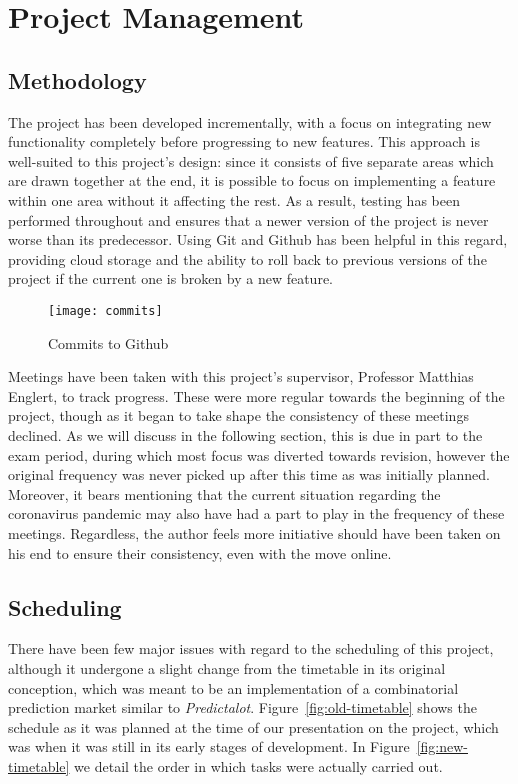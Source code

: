 \section{Project Management}

\label{sec:projectManagement}

\subsection{Methodology}

The project has been developed incrementally, with a focus on integrating new
functionality completely before progressing to new features. This approach is
well-suited to this project's design: since it consists of five separate areas
which are drawn together at the end, it is possible to focus on implementing a
feature within one area without it affecting the rest. As a result, testing has
been performed throughout and ensures that a newer version of the project is
never worse than its predecessor. Using Git and Github has been helpful in this
regard, providing cloud storage and the ability to roll back to previous
versions of the project if the current one is broken by a new feature.

\begin{figure}[h]
	\centering
	\texttt{[image: commits]}
	\caption{Commits to Github}
	\label{fig:commits}
\end{figure}

Meetings have been taken with this project's supervisor, Professor Matthias
Englert, to track progress. These were more regular towards the beginning of
the project, though as it began to take shape the consistency of these meetings
declined. As we will discuss in the following section, this is due in part to
the exam period, during which most focus was diverted towards revision, however
the original frequency was never picked up after this time as was initially
planned. Moreover, it bears mentioning that the current situation regarding the
coronavirus pandemic may also have had a part to play in the frequency of these
meetings. Regardless, the author feels more initiative should have been taken
on his end to ensure their consistency, even with the move online.

\subsection{Scheduling}

There have been few major issues with regard to the scheduling of this project,
although it undergone a slight change from the timetable in its original
conception, which was meant to be an implementation of a combinatorial
prediction market similar to \emph{Predictalot}. Figure~\ref{fig:old-timetable}
shows the schedule as it was planned at the time of our presentation on the
project, which was when it was still in its early stages of development. In
Figure~\ref{fig:new-timetable} we detail the order in which tasks were actually
carried out.

